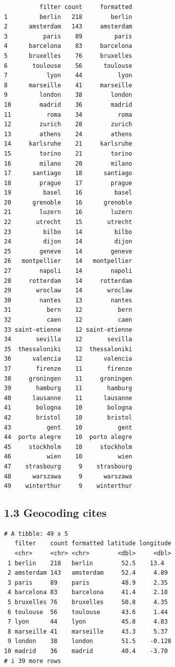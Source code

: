\documentclass[
  letterpaper,
  DIV=11,
  numbers=noendperiod]{scrartcl}
\begin{document}
\begin{verbatim}
          filter count     formatted
1         berlin   218        berlin
2      amsterdam   143     amsterdam
3          paris    89         paris
4      barcelona    83     barcelona
5      bruxelles    76     bruxelles
6       toulouse    56      toulouse
7           lyon    44          lyon
8      marseille    41     marseille
9         london    38        london
10        madrid    36        madrid
11          roma    34          roma
12        zurich    28        zurich
13        athens    24        athens
14     karlsruhe    21     karlsruhe
15        torino    21        torino
16        milano    20        milano
17      santiago    18      santiago
18        prague    17        prague
19         basel    16         basel
20      grenoble    16      grenoble
21        luzern    16        luzern
22       utrecht    15       utrecht
23         bilbo    14         bilbo
24         dijon    14         dijon
25        geneve    14        geneve
26   montpellier    14   montpellier
27        napoli    14        napoli
28     rotterdam    14     rotterdam
29       wroclaw    14       wroclaw
30        nantes    13        nantes
31          bern    12          bern
32          caen    12          caen
33 saint-etienne    12 saint-etienne
34       sevilla    12       sevilla
35  thessaloniki    12  thessaloniki
36      valencia    12      valencia
37       firenze    11       firenze
38     groningen    11     groningen
39       hamburg    11       hamburg
40      lausanne    11      lausanne
41       bologna    10       bologna
42       bristol    10       bristol
43          gent    10          gent
44  porto alegre    10  porto alegre
45     stockholm    10     stockholm
46          wien    10          wien
47    strasbourg     9    strasbourg
48      warszawa     9      warszawa
49    winterthur     9    winterthur
\end{verbatim}

\subsection{1.3 Geocoding cites}\label{geocoding-cites}

\begin{verbatim}
# A tibble: 49 x 5
   filter    count formatted latitude longitude
   <chr>     <chr> <chr>        <dbl>     <dbl>
 1 berlin    218   berlin        52.5    13.4  
 2 amsterdam 143   amsterdam     52.4     4.89 
 3 paris     89    paris         48.9     2.35 
 4 barcelona 83    barcelona     41.4     2.18 
 5 bruxelles 76    bruxelles     50.8     4.35 
 6 toulouse  56    toulouse      43.6     1.44 
 7 lyon      44    lyon          45.8     4.83 
 8 marseille 41    marseille     43.3     5.37 
 9 london    38    london        51.5    -0.128
10 madrid    36    madrid        40.4    -3.70 
# i 39 more rows
\end{verbatim}
\end{document}
